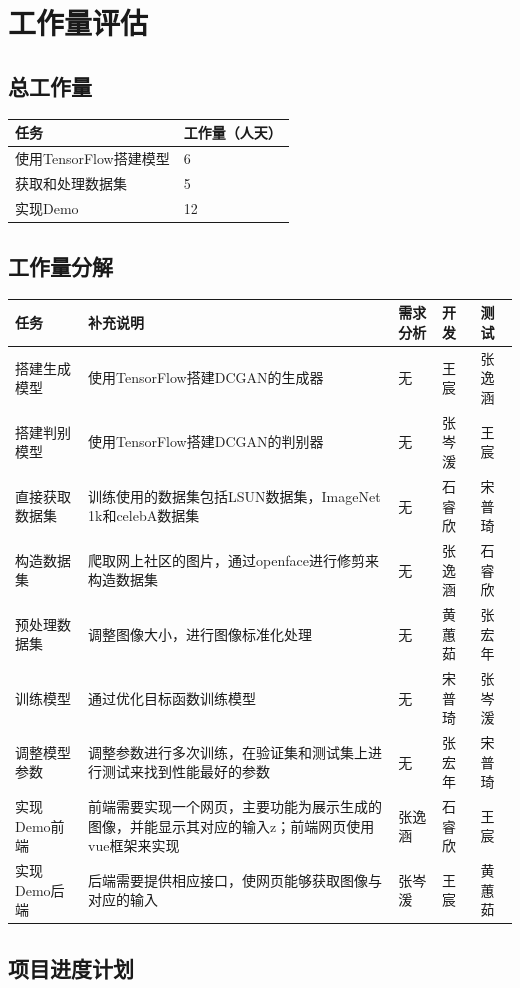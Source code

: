 \documentclass[
  hyperref, a4paper]{ctexart}
\begin{document}
\hypertarget{ux5de5ux4f5cux91cfux8bc4ux4f30}{%
\section{工作量评估}\label{ux5de5ux4f5cux91cfux8bc4ux4f30}}

\hypertarget{ux603bux5de5ux4f5cux91cf}{%
\subsection{总工作量}\label{ux603bux5de5ux4f5cux91cf}}

\begin{longtable}[]{@{}ll@{}}
\toprule
任务 & 工作量（人天）\tabularnewline
\midrule
\endhead
使用TensorFlow搭建模型 & 6\tabularnewline
获取和处理数据集 & 5\tabularnewline
实现Demo & 12\tabularnewline
\bottomrule
\end{longtable}

\hypertarget{ux5de5ux4f5cux91cfux5206ux89e3}{%
\subsection{工作量分解}\label{ux5de5ux4f5cux91cfux5206ux89e3}}

\begin{longtable}[]{@{}lllll@{}}
\toprule
任务 & 补充说明 & 需求分析 & 开发 & 测试\tabularnewline
\midrule
\endhead
搭建生成模型 & 使用TensorFlow搭建DCGAN的生成器 & 无 & 王宸 &
张逸涵\tabularnewline
搭建判别模型 & 使用TensorFlow搭建DCGAN的判别器 & 无 & 张岑湲 &
王宸\tabularnewline
直接获取数据集 & 训练使用的数据集包括LSUN数据集，ImageNet
1k和celebA数据集 & 无 & 石睿欣 & 宋普琦\tabularnewline
构造数据集 & 爬取网上社区的图片，通过openface进行修剪来构造数据集 & 无 &
张逸涵 & 石睿欣\tabularnewline
预处理数据集 & 调整图像大小，进行图像标准化处理 & 无 & 黄蕙茹 &
张宏年\tabularnewline
训练模型 & 通过优化目标函数训练模型 & 无 & 宋普琦 &
张岑湲\tabularnewline
调整模型参数 &
调整参数进行多次训练，在验证集和测试集上进行测试来找到性能最好的参数 &
无 & 张宏年 & 宋普琦\tabularnewline
实现Demo前端 &
前端需要实现一个网页，主要功能为展示生成的图像，并能显示其对应的输入z；前端网页使用vue框架来实现
& 张逸涵 & 石睿欣 & 王宸\tabularnewline
实现Demo后端 & 后端需要提供相应接口，使网页能够获取图像与对应的输入 &
张岑湲 & 王宸 & 黄蕙茹\tabularnewline
\bottomrule
\end{longtable}

\hypertarget{ux9879ux76eeux8fdbux5ea6ux8ba1ux5212}{%
\subsection{项目进度计划}\label{ux9879ux76eeux8fdbux5ea6ux8ba1ux5212}}
\end{document}
